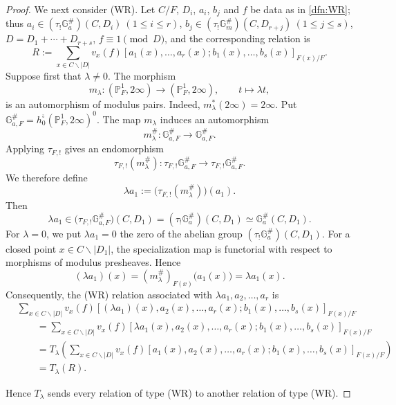 \documentclass[a4paper,12pt,reqno]{amsart}
\numberwithin{equation}{section}
\theoremstyle{definition}
\newcommand{\GaSharp}{\mathbb{G}_{a}^{\#}}
\newcommand{\GmSharp}{\mathbb G_m^{\#}}
\begin{document}
\begin{proof}
We next consider \textnormal{(WR)}.  
Let $C/F$, $D_i$, $a_i$, $b_j$ and $f$
be data as in \autoref{dfn:WR}; thus
$a_i\in(\tau_!\GaSharp)(C,D_i)\ (1\le i\le r)$, $b_j\in(\tau_!\GmSharp)(C,D_{r+j})\ (1\le j\le s)$, 
$D=D_1+\cdots+D_{r+s}$, $f\equiv1\pmod D$, 
and the corresponding relation is
\[
R := \sum_{x\in C\smallsetminus|D|}
 v_x(f)
 [a_1(x),\ldots,a_r(x);b_1(x),\dots, b_s(x)]_{F(x)/F}.
\]
Suppose first that $\lambda\neq0$.  The morphism
\[
 m_\lambda:
 (\mathbb P^1_F,2\infty)
 \to
 (\mathbb P^1_F,2\infty),
 \qquad
 t\mapsto \lambda t,
\]
is an automorphism of modulus pairs.  
Indeed, $m_\lambda^*(2\infty)=2\infty$.
Put $\mathbb G_{a,F}^\#
 =
 h_0^{\overline{\square}}
 (\mathbb P^1_F,2\infty)^0$. 
The map $m_\lambda$ induces an automorphism
\[
 m_\lambda^\#:
 \mathbb G_{a,F}^\#
 \to 
 \mathbb G_{a,F}^\#.
\]
Applying $\tau_{F,!}$ gives an endomorphism
\[
 \tau_{F,!}(m_\lambda^\#):
 \tau_{F,!}\mathbb G_{a,F}^\#
 \to
 \tau_{F,!}\mathbb G_{a,F}^\#.
\]
We therefore define
\[
 \lambda a_1
 :=
 \bigl(\tau_{F,!}(m_\lambda^\#)\bigr)(a_1).
\]
Then
\[
 \lambda a_1
 \in
 \bigl(\tau_{F,!}\mathbb G_{a,F}^\#\bigr)(C,D_1)
 =
 (\tau_!\GaSharp)(C,D_1)\simeq \GaSharp(C,D_1).
\]
For $\lambda=0$, we put $\lambda a_1=0$ the zero of the abelian group $(\tau_!\GaSharp)(C,D_1)$.
For a closed point 
$x\in C\smallsetminus|D_1|$, the specialization map
is functorial with respect to morphisms of modulus presheaves. 
Hence
\[
 (\lambda a_1)(x)
 =
 (m_\lambda^\#)_{F(x)}\bigl(a_1(x)\bigr) =\lambda a_1(x).
\]
Consequently, the \textnormal{(WR)} relation associated with
$\lambda a_1,a_2,\ldots,a_r$ is
\begin{align*}
 &\sum_{x\in C\smallsetminus|D|}
 v_x(f)
 [(\lambda a_1)(x),a_2(x),\ldots,a_r(x);b_1(x),\dots, b_s(x)]_{F(x)/F}\\
 &\qquad=
 \sum_{x\in C\smallsetminus|D|}
 v_x(f)
 [\lambda a_1(x),a_2(x),\ldots,a_r(x);b_1(x),\dots, b_s(x)]_{F(x)/F}\\
 &\qquad=
 T_\lambda
 \left(
 \sum_{x\in C\smallsetminus|D|}
 v_x(f)
 [a_1(x),a_2(x),\ldots,a_r(x);b_1(x),\dots, b_s(x)]_{F(x)/F}
 \right)\\
 &\qquad=T_\lambda(R).
\end{align*}


Hence $T_\lambda$ sends every relation of type \textnormal{(WR)} to
 another relation of type \textnormal{(WR)}.
\color{black}
\end{proof}
\end{document}
